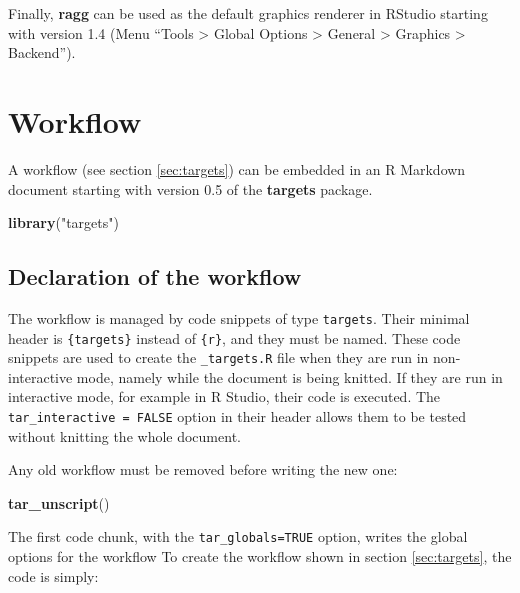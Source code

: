\documentclass[
  12pt,
  american,
  a4paper,
  extrafontsizes,onecolumn,openright
  ]{memoir}
\newenvironment{Shaded}{\begin{snugshade}}{\end{snugshade}}
\newcommand{\FunctionTok}[1]{\textcolor[rgb]{0.13,0.29,0.53}{\textbf{#1}}}
\newcommand{\NormalTok}[1]{#1}
\newcommand{\StringTok}[1]{\textcolor[rgb]{0.31,0.60,0.02}{#1}}
\begin{document}
\normalsize

Finally, \textbf{ragg} can be used as the default graphics renderer in RStudio starting with version 1.4 (Menu \enquote{Tools \textgreater{} Global Options \textgreater{} General \textgreater{} Graphics \textgreater{} Backend}).

\section{Workflow}\label{sec:targetsmd}

A workflow (see section \ref{sec:targets}) can be embedded in an R Markdown document starting with version 0.5 of the \textbf{targets} package.

\scriptsize

\begin{Shaded}
\begin{Highlighting}[]
\FunctionTok{library}\NormalTok{(}\StringTok{"targets"}\NormalTok{)}
\end{Highlighting}
\end{Shaded}

\normalsize

\subsection{Declaration of the workflow}\label{declaration-of-the-workflow}

The workflow is managed by code snippets of type \texttt{targets}.
Their minimal header is \texttt{\{targets\}} instead of \texttt{\{r\}}, and they must be named.
These code snippets are used to create the \texttt{\_targets.R} file when they are run in non-interactive mode, namely while the document is being knitted.
If they are run in interactive mode, for example in R Studio, their code is executed.
The \texttt{tar\_interactive\ =\ FALSE} option in their header allows them to be tested without knitting the whole document.

Any old workflow must be removed before writing the new one:

\scriptsize

\begin{Shaded}
\begin{Highlighting}[]
\FunctionTok{tar\_unscript}\NormalTok{()}
\end{Highlighting}
\end{Shaded}

\normalsize

The first code chunk, with the \texttt{tar\_globals=TRUE} option, writes the global options for the workflow
To create the workflow shown in section \ref{sec:targets}, the code is simply:
\end{document}
